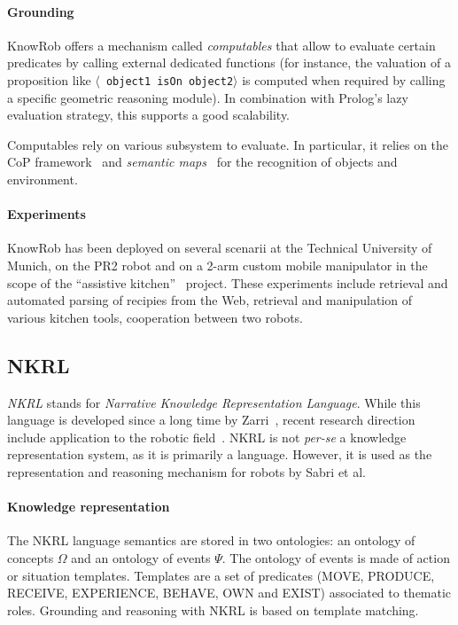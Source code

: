 \documentclass[a4paper, twocolumn]{article}
\newcommand{\stmt}[1]{{\footnotesize \tt $\langle$ #1\relax$\rangle$}}
\begin{document}
\paragraph{Grounding} {\sc KnowRob} offers a mechanism called \emph{computables} that allow to
evaluate certain predicates by calling external dedicated functions (for
instance, the valuation of a proposition like \stmt{object1 isOn object2} is
computed when required by calling a specific geometric reasoning module). In
combination with Prolog's lazy evaluation strategy, this supports a good
scalability.

Computables rely on various subsystem to evaluate. In particular, it relies on
the CoP framework~\cite{Klank2009} and \emph{semantic maps}~\cite{Blodow2011}
for the recognition of objects and environment.


\paragraph{Experiments} {\sc KnowRob} has been deployed on several scenarii at
the Technical University of Munich, on the PR2 robot and on a 2-arm custom
mobile manipulator in the scope of the ``assistive kitchen''~\cite{Beetz2008}
project. These experiments include retrieval and automated parsing of recipies
from the Web, retrieval and manipulation of various kitchen tools, cooperation
between two robots.

\subsection{NKRL}
\label{sect|nkrl}

\emph{NKRL} stands for \emph{Narrative Knowledge Representation Language}.
While this language is developed since a long time by Zarri~\cite{Zarri1997,
Zarri2008}, recent research direction include application to the robotic
field~\cite{Sabri2011}. NKRL is not {\it per-se} a knowledge representation
system, as it is primarily a language. However, it is used as the
representation and reasoning mechanism for robots by Sabri et al.

\paragraph{Knowledge representation} The NKRL language semantics are stored in
two ontologies: an ontology of concepts $\Omega$ and an ontology of events
$\Psi$. The ontology of events is made of action or situation templates.
Templates are a set of predicates (MOVE, PRODUCE, RECEIVE, EXPERIENCE, BEHAVE,
OWN and EXIST) associated to thematic roles. Grounding and reasoning with NKRL
is based on template matching.
\end{document}
